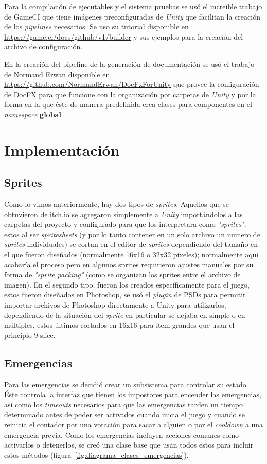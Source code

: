 Para la compilación de ejecutables y el sistema pruebas se usó el increíble trabajo de GameCI que tiene imágenes preconfiguradas de \textit{Unity} que facilitan la creación de los \textit{pipelines} necesarios. Se uso su tutorial disponible en \url{https://game.ci/docs/github/v1/builder} y sus ejemplos para la creación del archivo de configuración.

En la creación del pipeline de la generación de documentación se usó el trabajo de Normand Erwan disponible en \url{https://github.com/NormandErwan/DocFxForUnity} que provee la configuración de DocFX para que funcione con la organización por carpetas de \textit{Unity} y por la forma en la que éste de manera predefinida crea clases para componentes en el \textit{namespace} \textbf{global}.

\section{Implementación}
\subsection{Sprites}
Como lo vimos anteriormente, hay dos tipos de \textit{sprites}. Aquellos que se obtuvieron de itch.io se agregaron simplemente a \textit{Unity} importándolos a las carpetas del proyecto y configurado para que los interpretara como \textit{"sprites"}, estos al ser \textit{spritesheets} (y por lo tanto contener en un solo archivo un numero de \textit{sprites} individuales) se cortan en el editor de \textit{sprites} dependiendo del tamaño en el que fueron diseñados (normalmente 16x16 o 32x32 píxeles); normalmente aquí acabaría el proceso pero en algunos sprites requirieron ajustes manuales por su forma de \textit{"sprite packing"} (como se organizan los sprites entre el archivo de imagen). En el segundo tipo, fueron los creados específicamente para el juego, estos fueron diseñados en Photoshop, se usó el \textit{plugin} de PSDs para permitir importar archivos de Photoshop directamente a Unity para utilizarlos, dependiendo de la situación del \textit{sprite} en particular se dejaba en simple o en múltiples, estos últimos cortados en  16x16 para ítem grandes que usan el principio 9-slice.

\subsection{Emergencias}
Para las emergencias se decidió crear un subsistema para controlar su estado. Éste controla la interfaz que tienen los impostores para encender las emergencias, así como los \textit{timeouts} necesarios para que las emergencias tarden un tiempo determinado antes de poder ser activados cuando inicia el juego y cuando se reinicia el contador por una votación para sacar a alguien o por el \textit{cooldown} a una emergencia previa.
Como los emergencias incluyen acciones comunes como activarlos o detenerlos, se creó una clase base que usan todos estos para incluir estos métodos (figura~\ref{fig:diagrama_clases_emergencias}).


